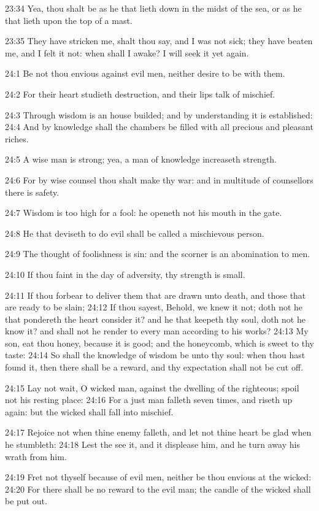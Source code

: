 23:34 Yea, thou shalt be as he that lieth down in the midst of the
sea, or as he that lieth upon the top of a mast.

23:35 They have stricken me, shalt thou say, and I was not sick; they
have beaten me, and I felt it not: when shall I awake? I will seek it
yet again.

24:1 Be not thou envious against evil men, neither desire to be with
them.

24:2 For their heart studieth destruction, and their lips talk of
mischief.

24:3 Through wisdom is an house builded; and by understanding it is
established: 24:4 And by knowledge shall the chambers be filled with
all precious and pleasant riches.

24:5 A wise man is strong; yea, a man of knowledge increaseth
strength.

24:6 For by wise counsel thou shalt make thy war: and in multitude of
counsellors there is safety.

24:7 Wisdom is too high for a fool: he openeth not his mouth in the
gate.

24:8 He that deviseth to do evil shall be called a mischievous person.

24:9 The thought of foolishness is sin: and the scorner is an
abomination to men.

24:10 If thou faint in the day of adversity, thy strength is small.

24:11 If thou forbear to deliver them that are drawn unto death, and
those that are ready to be slain; 24:12 If thou sayest, Behold, we
knew it not; doth not he that pondereth the heart consider it? and he
that keepeth thy soul, doth not he know it? and shall not he render to
every man according to his works?  24:13 My son, eat thou honey,
because it is good; and the honeycomb, which is sweet to thy taste:
24:14 So shall the knowledge of wisdom be unto thy soul: when thou
hast found it, then there shall be a reward, and thy expectation shall
not be cut off.

24:15 Lay not wait, O wicked man, against the dwelling of the
righteous; spoil not his resting place: 24:16 For a just man falleth
seven times, and riseth up again: but the wicked shall fall into
mischief.

24:17 Rejoice not when thine enemy falleth, and let not thine heart be
glad when he stumbleth: 24:18 Lest the \LORD see it, and it displease
him, and he turn away his wrath from him.

24:19 Fret not thyself because of evil men, neither be thou envious at
the wicked: 24:20 For there shall be no reward to the evil man; the
candle of the wicked shall be put out.

